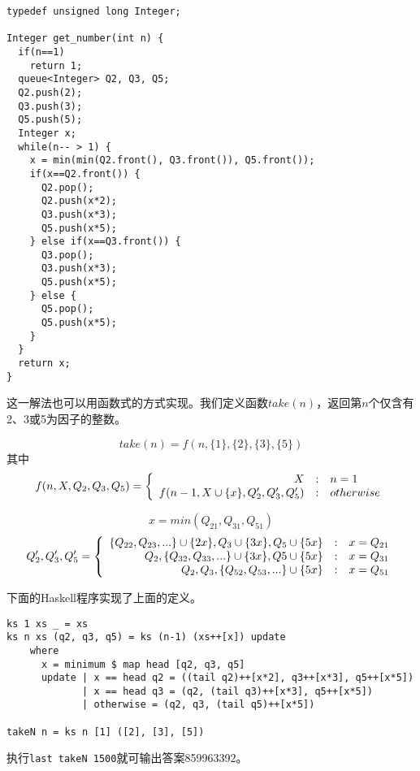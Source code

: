 \documentclass[UTF8]{article}
\begin{document}
\lstset{language=C++}
\begin{lstlisting}
typedef unsigned long Integer;

Integer get_number(int n) {
  if(n==1)
    return 1;
  queue<Integer> Q2, Q3, Q5;
  Q2.push(2);
  Q3.push(3);
  Q5.push(5);
  Integer x;
  while(n-- > 1) {
    x = min(min(Q2.front(), Q3.front()), Q5.front());
    if(x==Q2.front()) {
      Q2.pop();
      Q2.push(x*2);
      Q3.push(x*3);
      Q5.push(x*5);
    } else if(x==Q3.front()) {
      Q3.pop();
      Q3.push(x*3);
      Q5.push(x*5);
    } else {
      Q5.pop();
      Q5.push(x*5);
    }
  }
  return x;
}
\end{lstlisting}

这一解法也可以用函数式的方式实现。我们定义函数$take(n)$，返回第$n$个仅含有2、3或5为因子的整数。

\[
  take(n) = f(n, \{1\}, \{2\}, \{3\}, \{5\})
\]
其中
\[
 f(n, X, Q_2, Q_3, Q_5) = \left \{
  \begin{array}{r@{\quad:\quad}l}
  X & n = 1 \\
  f(n-1, X \cup \{x\}, Q_2', Q_3', Q_5') & otherwise
  \end{array}
\right.
\]

\[
 x = min(Q_{21}, Q_{31}, Q_{51})
\]
\[
 Q_2', Q_3', Q_5' = \left \{
 \begin{array}{r@{\quad:\quad}l}
 \{Q_{22}, Q_{23}, ...\} \cup \{2x\}, Q_3 \cup \{3x\}, Q_5 \cup \{5x\} & x = Q_{21} \\
 Q_2, \{Q_{32}, Q_{33}, ...\} \cup \{3x\}, Q5 \cup \{5x\} & x = Q_{31} \\
 Q_2, Q_3, \{Q_{52}, Q_{53}, ...\} \cup \{5x\} & x = Q_{51}
 \end{array}
 \right.
\]

下面的Haskell程序实现了上面的定义。

\lstset{language=Haskell}
\begin{lstlisting}
ks 1 xs _ = xs
ks n xs (q2, q3, q5) = ks (n-1) (xs++[x]) update
    where
      x = minimum $ map head [q2, q3, q5]
      update | x == head q2 = ((tail q2)++[x*2], q3++[x*3], q5++[x*5])
             | x == head q3 = (q2, (tail q3)++[x*3], q5++[x*5])
             | otherwise = (q2, q3, (tail q5)++[x*5])

takeN n = ks n [1] ([2], [3], [5])
\end{lstlisting} %

执行\texttt{last takeN 1500}就可输出答案859963392。

\end{document}
